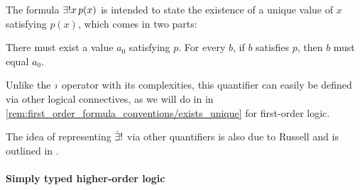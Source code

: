\begin{concept}
\begin{thmenum}
    The formula \( \qExists* x p(x) \) is intended to state the existence of a unique value of \( x \) satisfying \( p(x) \), which comes in two parts:
    \begin{thmenum}
       There must exist a value \( a_0 \) satisfying \( p \).
       For every \( b \), if \( b \) satisfies \( p \), then \( b \) must equal \( a_0 \).
    \end{thmenum}

    Unlike the \( \rotiota \) operator with its complexities, this quantifier can easily be defined via other logical connectives, as we will do in in \cref{rem:first_order_formula_conventions/exists_unique} for first-order logic.
  \end{thmenum}
\end{concept}
\begin{comments}
  \item The idea of representing \( \mathord{\dot{\exists} !} \) via other quantifiers is also due to Russell and is outlined in \cite{Russell1905OnDenoting}.
\end{comments}

\paragraph{Simply typed higher-order logic}

